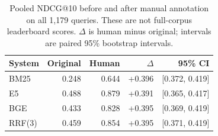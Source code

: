 \begin{table}[t]
\caption{Pooled NDCG@10 before and after manual annotation on all 1,179 queries. These are not full-corpus leaderboard scores. $\Delta$ is human minus original; intervals are paired 95\% bootstrap intervals.}
\label{tab:manual-results}
\centering\small
\begin{tabularx}{\textwidth}{@{}Lrrrr@{}}
\toprule
System & Original & Human & $\Delta$ & 95\% CI \\
\midrule
BM25 & 0.248 & 0.644 & +0.396 & [0.372, 0.419] \\
E5 & 0.488 & 0.879 & +0.391 & [0.365, 0.417] \\
BGE & 0.433 & 0.828 & +0.395 & [0.369, 0.419] \\
RRF(3) & 0.459 & 0.854 & +0.395 & [0.371, 0.419] \\
\bottomrule
\end{tabularx}
\end{table}
